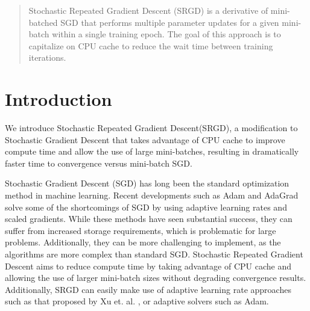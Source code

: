 \documentclass[,conference,compsoc]{IEEEtran}
\begin{document}
\maketitle

\begin{abstract}
    Stochastic Repeated Gradient Descent (SRGD) is a derivative of mini-batched
    SGD that performs multiple parameter updates for a given mini-batch within a
    single training epoch. The goal of this approach is to capitalize on CPU
    cache to reduce the wait time between training iterations.
\end{abstract}





%



\section{Introduction}
We introduce Stochastic Repeated Gradient Descent(SRGD), a modification to
Stochastic Gradient Descent that takes advantage of CPU cache to improve compute
time and allow the use of large mini-batches, resulting in dramatically faster
time to convergence versus mini-batch SGD. 

Stochastic Gradient Descent (SGD) has long been the standard optimization method
in machine learning. Recent developments such as Adam and AdaGrad solve some of
the shortcomings of SGD by using adaptive learning rates and scaled gradients.
While these methods have seen substantial success, they can suffer from
increased storage requirements, which is problematic for large problems.
Additionally, they can be more challenging to implement, as the algorithms are
more complex than standard SGD. Stochastic Repeated Gradient Descent aims to
reduce compute time by taking advantage of CPU cache and allowing the use of
larger mini-batch sizes without degrading convergence results. Additionally,
SRGD can easily make use of adaptive learning rate approaches such as that
proposed by Xu et. al. \cite{bib:xu-assgd}, or adaptive solvers such as Adam.
\end{document}
